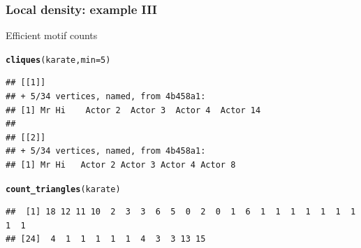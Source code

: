 \documentclass{beamer}\usepackage[]{graphicx}\usepackage[]{color}
\makeatletter
\newcommand{\hlnum}[1]{\textcolor[rgb]{0.686,0.059,0.569}{#1}}%
\newcommand{\hlstd}[1]{\textcolor[rgb]{0.345,0.345,0.345}{#1}}%
\newcommand{\hlkwc}[1]{\textcolor[rgb]{0.333,0.667,0.333}{#1}}%
\newcommand{\hlkwd}[1]{\textcolor[rgb]{0.737,0.353,0.396}{\textbf{#1}}}%
\newenvironment{kframe}{%
 \def\at@end@of@kframe{}%
 \ifinner\ifhmode%
  \def\at@end@of@kframe{\end{minipage}}%
  \begin{minipage}{\columnwidth}%
 \fi\fi%
 \def\FrameCommand##1{\hskip\@totalleftmargin \hskip-\fboxsep
 \colorbox{shadecolor}{##1}\hskip-\fboxsep
     \hskip-\linewidth \hskip-\@totalleftmargin \hskip\columnwidth}%
 \MakeFramed {\advance\hsize-\width
   \@totalleftmargin\z@ \linewidth\hsize
   \@setminipage}}%
 {\par\unskip\endMakeFramed%
 \at@end@of@kframe}
\newenvironment{knitrout}{}{} %
\makeatother
\begin{document}
\begin{frame}[fragile]
  \frametitle{Local density: example III}

Efficient motif counts
\begin{knitrout}\scriptsize
{}\color{fgcolor}\begin{kframe}
\begin{alltt}
\hlkwd{cliques}\hlstd{(karate,} \hlkwc{min} \hlstd{=} \hlnum{5}\hlstd{)}
\end{alltt}
\begin{verbatim}
## [[1]]
## + 5/34 vertices, named, from 4b458a1:
## [1] Mr Hi    Actor 2  Actor 3  Actor 4  Actor 14
## 
## [[2]]
## + 5/34 vertices, named, from 4b458a1:
## [1] Mr Hi   Actor 2 Actor 3 Actor 4 Actor 8
\end{verbatim}
\begin{alltt}
\hlkwd{count_triangles}\hlstd{(karate)}
\end{alltt}
\begin{verbatim}
##  [1] 18 12 11 10  2  3  3  6  5  0  2  0  1  6  1  1  1  1  1  1  1  1  1
## [24]  4  1  1  1  1  1  4  3  3 13 15
\end{verbatim}
\end{kframe}
\end{knitrout}

\end{frame}
\end{document}
